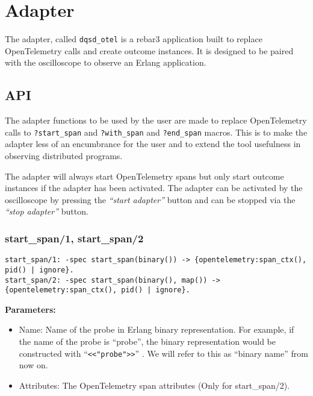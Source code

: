 \section{Adapter}
    The adapter, called \texttt{dqsd\_otel} is a rebar3 \cite{rebar3} application built to replace OpenTelemetry calls and create outcome instances. It is designed to be paired with the oscilloscope to observe an Erlang application.
    
    \subsection{API}
        The adapter functions to be used by the user are made to replace OpenTelemetry calls to \texttt{?start\_span} and \texttt{?with\_span} and \texttt{?end\_span} macros. This is to make the adapter less of an encumbrance for the user and to extend the tool usefulness in observing distributed programs. 

        The adapter will always start OpenTelemetry spans but only start outcome instances if the adapter has been activated. The adapter can be activated by the oscilloscope by pressing the \textit{``start adapter''} button and can be stopped via the \textit{``stop adapter''} button.
         
        \subsubsection{start\_span/1, start\_span/2}
        
        \begin{verbatim}        
start_span/1: -spec start_span(binary()) -> {opentelemetry:span_ctx(), pid() | ignore}.
start_span/2: -spec start_span(binary(), map()) -> {opentelemetry:span_ctx(), pid() | ignore}.  
        \end{verbatim}
        
        \textbf{Parameters:}
        \begin{itemize}
            \item Name: Name of the probe in Erlang binary representation. For example, if the name of the probe is ``probe'', the binary representation would be constructed with ``\texttt{<<"probe">>}'' \cite{bin-erl} \cite{bit-syntax}. We will refer to this as ``binary name'' from now on.
            \item Attributes: The OpenTelemetry span attributes (Only for start\_span/2).
        \end{itemize} 
        
